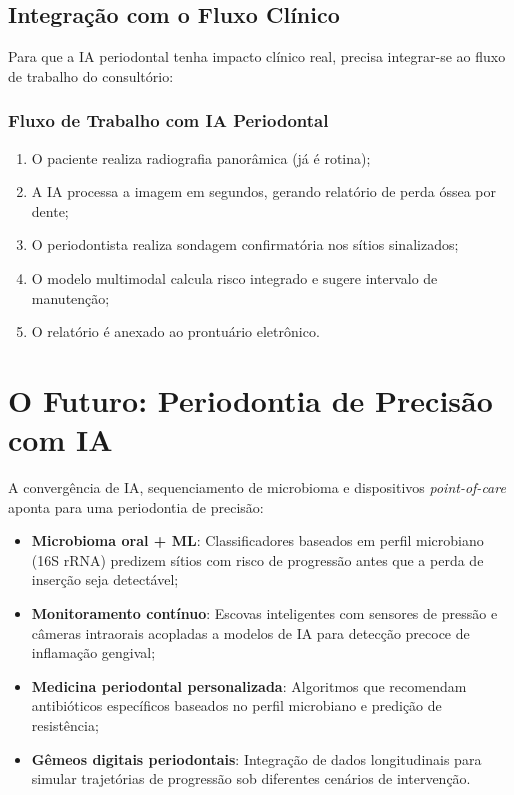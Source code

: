 \subsection{Integração com o Fluxo Clínico}

Para que a IA periodontal tenha impacto clínico real, precisa integrar-se ao fluxo de trabalho do consultório:

\subsubsection{Fluxo de Trabalho com IA Periodontal}

\begin{enumerate}
    \item O paciente realiza radiografia panorâmica (já é rotina);
    \item A IA processa a imagem em segundos, gerando relatório de perda óssea por dente;
    \item O periodontista realiza sondagem confirmatória nos sítios sinalizados;
    \item O modelo multimodal calcula risco integrado e sugere intervalo de manutenção;
    \item O relatório é anexado ao prontuário eletrônico.
\end{enumerate}

\section{O Futuro: Periodontia de Precisão com IA}

A convergência de IA, sequenciamento de microbioma e dispositivos \textit{point-of-care} aponta para uma periodontia de precisão:
\begin{itemize}
    \item \textbf{Microbioma oral + ML}: Classificadores baseados em perfil microbiano (16S rRNA) predizem sítios com risco de progressão antes que a perda de inserção seja detectável;
    \item \textbf{Monitoramento contínuo}: Escovas inteligentes com sensores de pressão e câmeras intraorais acopladas a modelos de IA para detecção precoce de inflamação gengival;
    \item \textbf{Medicina periodontal personalizada}: Algoritmos que recomendam antibióticos específicos baseados no perfil microbiano e predição de resistência;
    \item \textbf{Gêmeos digitais periodontais}: Integração de dados longitudinais para simular trajetórias de progressão sob diferentes cenários de intervenção.
\end{itemize}

